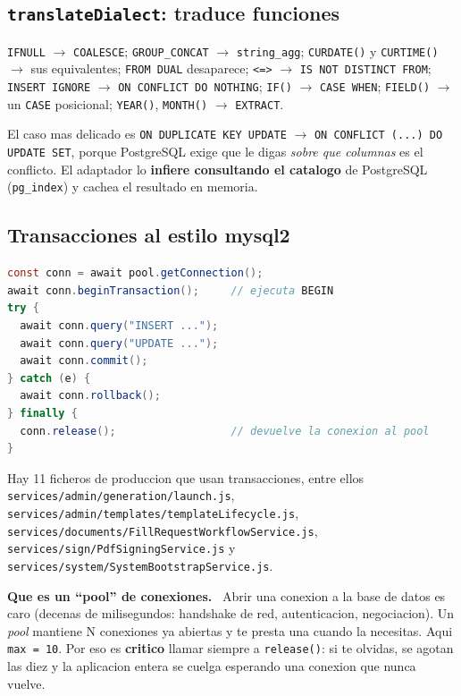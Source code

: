 \documentclass[11pt,a4paper,oneside]{report}
\newenvironment{concepto}[1][Concepto para juniors]{%
  \par\medskip
  \colorlet{shadecolor}{blue!7}%
  \begin{shaded}\noindent\textbf{\color{blue!55!black}#1.}\ \ignorespaces}%
  {\end{shaded}\par\medskip}
\newcommand{\rt}[1]{\texttt{#1}}
\begin{document}
\subsection{\rt{translateDialect}: traduce funciones}

\rt{IFNULL} $\rightarrow$ \rt{COALESCE}; \rt{GROUP\_CONCAT} $\rightarrow$ \rt{string\_agg};
\rt{CURDATE()} y \rt{CURTIME()} $\rightarrow$ sus equivalentes; \rt{FROM DUAL} desaparece;
\rt{<=>} $\rightarrow$ \rt{IS NOT DISTINCT FROM}; \rt{INSERT IGNORE} $\rightarrow$
\rt{ON CONFLICT DO NOTHING}; \rt{IF()} $\rightarrow$ \rt{CASE WHEN}; \rt{FIELD()}
$\rightarrow$ un \rt{CASE} posicional; \rt{YEAR()}, \rt{MONTH()} $\rightarrow$ \rt{EXTRACT}.

El caso mas delicado es \rt{ON DUPLICATE KEY UPDATE} $\rightarrow$
\rt{ON CONFLICT (...) DO UPDATE SET}, porque PostgreSQL exige que le digas \emph{sobre que
columnas} es el conflicto. El adaptador lo \textbf{infiere consultando el catalogo} de
PostgreSQL (\rt{pg\_index}) y cachea el resultado en memoria.

\subsection{Transacciones al estilo mysql2}

\begin{lstlisting}[language=Java]
const conn = await pool.getConnection();
await conn.beginTransaction();     // ejecuta BEGIN
try {
  await conn.query("INSERT ...");
  await conn.query("UPDATE ...");
  await conn.commit();
} catch (e) {
  await conn.rollback();
} finally {
  conn.release();                  // devuelve la conexion al pool
}
\end{lstlisting}

Hay 11 ficheros de produccion que usan transacciones, entre ellos
\rt{services/admin/generation/launch.js}, \rt{services/admin/templates/templateLifecycle.js},
\rt{services/documents/FillRequestWorkflowService.js}, \rt{services/sign/PdfSigningService.js}
y \rt{services/system/SystemBootstrapService.js}.

\begin{concepto}[Que es un ``pool'' de conexiones]
Abrir una conexion a la base de datos es caro (decenas de milisegundos: handshake de red,
autenticacion, negociacion). Un \emph{pool} mantiene N conexiones ya abiertas y te presta una
cuando la necesitas. Aqui \rt{max = 10}. Por eso es \textbf{critico} llamar siempre a
\rt{release()}: si te olvidas, se agotan las diez y la aplicacion entera se cuelga esperando
una conexion que nunca vuelve.
\end{concepto}
\end{document}
